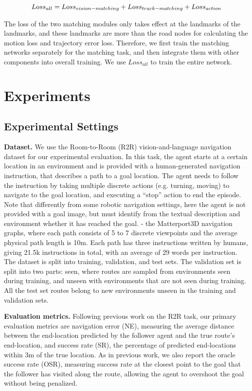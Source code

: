 \begin{equation}
	\centering
	{Loss}_{all} = {Loss}_{vision-matching} + {Loss}_{track-matching} + {Loss}_{action}
\end{equation}

The loss of the two matching modules only takes effect at the landmarks of the landmarks, and these landmarks are more than the road nodes for calculating the motion loss and trajectory error loss. Therefore, we first train the matching networks separately for the matching task, and then integrate them with other components into overall training. We use ${Loss}_{all}$ to train the entire network.

\section{Experiments}
	
\subsection{Experimental Settings}
	
\textbf{Dataset.} We use the Room-to-Room (R2R) vision-and-language navigation dataset for our experimental evaluation\cite{anderson2018vision}. In this task, the agent starts at a certain location in an environment and is provided with a human-generated navigation instruction, that describes a path to a goal location. The agent needs to follow the instruction by taking multiple discrete actions (e.g. turning, moving) to navigate to the goal location, and executing a “stop” action to end the episode. Note that differently from some robotic navigation settings, here the agent is not provided with a goal image, but must identify from the textual description and environment whether it has reached the goal.
	- the Matterport3D navigation graphs, where each path consists of 5 to 7 discrete viewpoints and the average physical path length is 10m. Each path has three instructions written by humans, giving 21.5k instructions in total, with an average of 29 words per instruction. The dataset is split into training, validation, and test sets. The validation set is split into two parts: seen, where routes are sampled from environments seen during training, and unseen with environments that are not seen during training. All the test set routes belong to new environments unseen in the training and validation sets.

\textbf{Evaluation metrics.} Following previous work on the R2R task, our primary evaluation metrics are navigation error (NE), measuring the average distance between the end-location predicted by the follower agent and the true route’s end-location, and success rate (SR), the percentage of predicted end-locations within 3m of the true location. As in previous work, we also report the oracle success rate (OSR), measuring success rate at the closest point to the goal that the follower has visited along the route, allowing the agent to overshoot the goal without being penalized.

